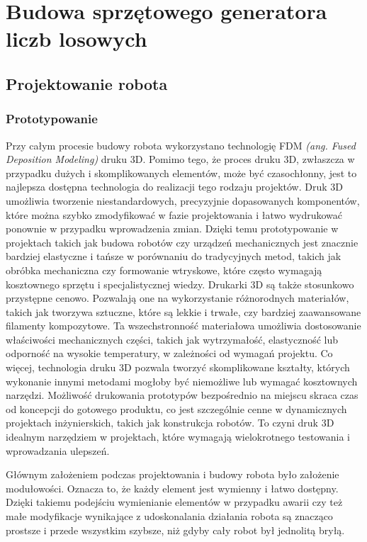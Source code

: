 
\chapter{Budowa sprzętowego generatora liczb losowych}\label{ch:budowa-sprzetowego-generatora}


\section{Projektowanie robota}\label{sec:projektowanie-robota}

\subsection{Prototypowanie}\label{subsec:prototypowanie}

Przy całym procesie budowy robota wykorzystano technologię FDM \textit{(ang. Fused Deposition Modeling)} druku 3D. Pomimo tego, że proces druku 3D, zwłaszcza w przypadku dużych i skomplikowanych elementów, może być czasochłonny, jest to najlepsza dostępna
technologia do realizacji tego rodzaju projektów. Druk 3D umożliwia tworzenie niestandardowych, precyzyjnie dopasowanych komponentów, które można 
szybko zmodyfikować w fazie projektowania i łatwo wydrukować ponownie w przypadku wprowadzenia zmian. Dzięki temu prototypowanie w projektach takich 
jak budowa robotów czy urządzeń mechanicznych jest znacznie bardziej elastyczne i tańsze w porównaniu do tradycyjnych metod, takich jak obróbka 
mechaniczna czy formowanie wtryskowe, które często wymagają kosztownego sprzętu i specjalistycznej wiedzy.
Drukarki 3D są także stosunkowo przystępne cenowo. Pozwalają one na wykorzystanie różnorodnych materiałów, takich jak tworzywa sztuczne, które są lekkie 
i trwałe, czy bardziej zaawansowane filamenty kompozytowe. Ta wszechstronność materiałowa umożliwia dostosowanie właściwości mechanicznych części, takich 
jak wytrzymałość, elastyczność lub odporność na wysokie temperatury, w zależności od wymagań projektu.
Co więcej, technologia druku 3D pozwala tworzyć skomplikowane kształty, których wykonanie innymi metodami mogłoby być niemożliwe lub wymagać kosztownych 
narzędzi. Możliwość drukowania prototypów bezpośrednio na miejscu skraca czas od koncepcji do gotowego produktu, co jest szczególnie cenne w dynamicznych 
projektach inżynierskich, takich jak konstrukcja robotów. To czyni druk 3D idealnym narzędziem w projektach, które wymagają wielokrotnego 
testowania i wprowadzania ulepszeń.

Głównym założeniem podczas projektowania i budowy robota było założenie modułowości. Oznacza to, że każdy element jest wymienny i łatwo dostępny.
Dzięki takiemu podejściu wymienianie elementów w przypadku awarii czy też małe modyfikacje wynikające z udoskonalania działania robota
są znacząco prostsze i przede wszystkim szybsze, niż gdyby cały robot był jednolitą bryłą.

